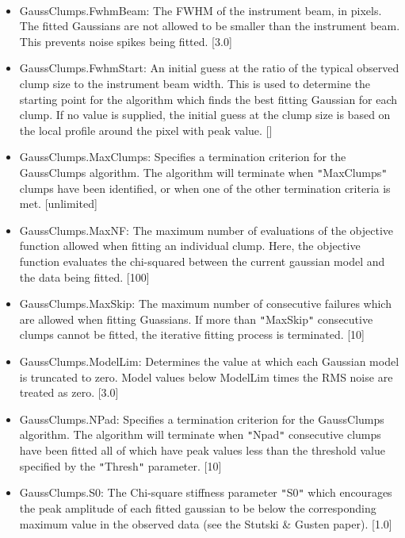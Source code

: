 \documentclass[twoside,11pt]{article}
\renewcommand{\_}{\texttt{\symbol{95}}}
\newcommand{\sstitemlist}[1]{
  \mbox{} \\
  \vspace{-3.5ex}
  \begin{itemize}
     #1
  \end{itemize}
}
\newcommand{\sstitem}{\item}
\newcommand{\sstitemlist}[1]{
      \begin{itemize}
         #1
      \end{itemize}
      \\
   }
\newcommand{\sstitem}{\item}
\begin{document}
{{      \sstitemlist{

         \sstitem
         GaussClumps.FwhmBeam: The FWHM of the instrument beam, in
         pixels. The fitted Gaussians are not allowed to be smaller than the
         instrument beam. This prevents noise spikes being fitted. [3.0]

         \sstitem
         GaussClumps.FwhmStart: An initial guess at the ratio of the typical
         observed clump size to the instrument beam width. This is used to
         determine the starting point for the algorithm which finds the best
         fitting Gaussian for each clump. If no value is supplied, the
         initial guess at the clump size is based on the local profile
         around the pixel with peak value. []

         \sstitem
         GaussClumps.MaxClumps: Specifies a termination criterion for
         the GaussClumps algorithm. The algorithm will terminate when
         {\tt "}MaxClumps{\tt "} clumps have been identified, or when one of the other
         termination criteria is met. [unlimited]

         \sstitem
         GaussClumps.MaxNF: The maximum number of evaluations of the
         objective function allowed when fitting an individual clump. Here,
         the objective function evaluates the chi-squared between the
         current gaussian model and the data being fitted. [100]

         \sstitem
         GaussClumps.MaxSkip: The maximum number of consecutive failures
         which are allowed when fitting Guassians. If more than {\tt "}MaxSkip{\tt "}
         consecutive clumps cannot be fitted, the iterative fitting
         process is terminated. [10]

         \sstitem
         GaussClumps.ModelLim: Determines the value at which each Gaussian
         model is truncated to zero. Model values below ModelLim times the RMS
         noise are treated as zero. [3.0]

         \sstitem
         GaussClumps.NPad: Specifies a termination criterion for the
         GaussClumps algorithm. The algorithm will terminate when {\tt "}Npad{\tt "}
         consecutive clumps have been fitted all of which have peak values less
         than the threshold value specified by the {\tt "}Thresh{\tt "} parameter. [10]

         \sstitem
         GaussClumps.S0: The Chi-square stiffness parameter {\tt "}S0{\tt "} which
         encourages the peak amplitude of each fitted gaussian to be below
         the corresponding maximum value in the observed data (see the Stutski
         \& Gusten paper). [1.0]

}}}
\end{document}
